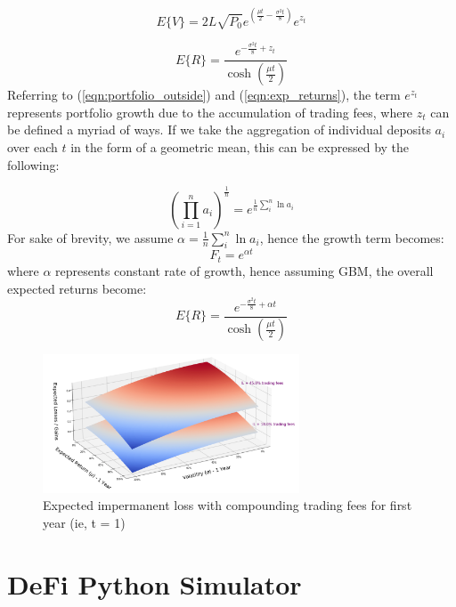 \documentclass[journal,twocolumn,12pt]{ieeesyscoin}
\begin{document}
\lipsum[1]

\begin{equation}\label{eqn:portfolio_outside}
  E\{V\} = 2 L \sqrt{P_{0}}  e^{(\frac{\mu t}{2} - \frac{\sigma^2 t}{8})}e^{z_{t}}
\end{equation}

\begin{equation}\label{eqn:exp_returns}
  E\{R\} = \frac{e^{-\frac{\sigma^2 t}{8} + z_{t}}}{\cosh (\frac{\mu t}{2})}
\end{equation}
Referring to (\ref{eqn:portfolio_outside}) and (\ref{eqn:exp_returns}), the term $e^{z_{t}}$ represents portfolio growth due to the accumulation of trading fees, where $z_{t}$ can be defined a myriad of ways. If we take the aggregation of individual deposits $a_{i}$ over each $t$ in the form of a geometric mean, this can be expressed by the following:

\begin{equation}\label{eqn:geo_mean}
  (\prod_{i=1}^{n}a_{i})^{\frac{1}{n}} = e^{\frac{1}{n}\sum_{i}^{n}\ln a_{i}}
\end{equation}
For sake of brevity, we assume $\alpha = \frac{1}{n}\sum_{i}^{n}\ln a_{i}$, hence the growth term becomes:
\begin{equation}\label{eqn:geo_mean}
  F_{t} = e^{\alpha t}
\end{equation}
where $\alpha$ represents constant rate of growth, hence assuming GBM, the overall expected returns become:
\begin{equation}\label{eqn:exp_returns}
  E\{R\} = \frac{e^{-\frac{\sigma^2 t}{8} + \alpha t}}{\cosh (\frac{\mu t}{2})}
\end{equation}

\begin{figure}[h!]
\includegraphics[width=3in]{img/imp_loss_compounding_fees.png}
\caption{Expected impermanent loss with compounding trading fees for first year (ie, t = 1)} 
\label{fig:daosys_protocol}
\end{figure}

\section{DeFi Python Simulator}
\label{sec:python_simulator}
\end{document}
